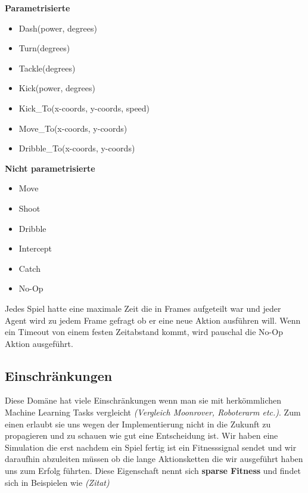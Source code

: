             \begin{multicols}{2}
                \textbf{Parametrisierte}
                \begin{itemize}
                    \item Dash(power, degrees)
                    \item Turn(degrees)
                    \item Tackle(degrees)
                    \item Kick(power, degrees)
                    \item Kick\_To(x-coords, y-coords, speed)
                    \item Move\_To(x-coords, y-coords)
                    \item Dribble\_To(x-coords, y-coords)
                \end{itemize}
                \textbf{Nicht parametrisierte}
                \begin{itemize}
                    \item Move
                    \item Shoot
                    \item Dribble
                    \item Intercept
                    \item Catch
                    \item No-Op
                \end{itemize}
            \end{multicols}
            \noindent
            Jedes Spiel hatte eine maximale Zeit die in Frames aufgeteilt war und jeder Agent wird zu jedem Frame gefragt ob er eine neue Aktion ausführen will. Wenn ein Timeout von einem festen Zeitabstand kommt, wird pauschal die No-Op Aktion ausgeführt.

        \subsection{Einschränkungen}
            Diese Domäne hat viele Einschränkungen wenn man sie mit herkömmlichen Machine Learning Tasks vergleicht \textit{(Vergleich Moonrover, Roboterarm etc.)}. Zum einen erlaubt sie uns wegen der Implementierung nicht in die Zukunft zu propagieren und zu schauen wie gut eine Entscheidung ist. Wir haben eine Simulation die erst nachdem ein Spiel fertig ist ein Fitnesssignal sendet und wir daraufhin abzuleiten müssen ob die lange Aktionsketten die wir ausgeführt haben uns zum Erfolg führten. Diese Eigenschaft nennt sich \textbf{sparse Fitness} und findet sich in Beispielen wie \textit{(Zitat)}

